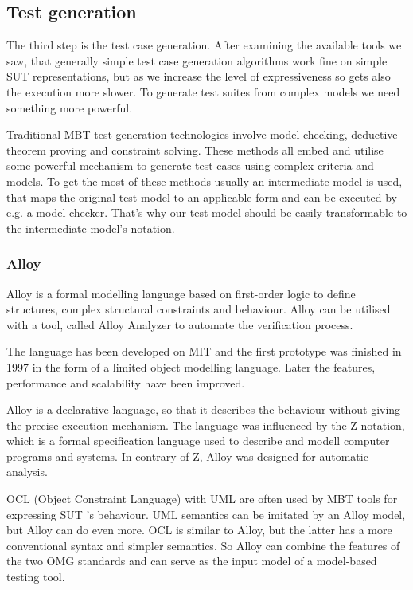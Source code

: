 
\subsection{Test generation}
\label{sub:designtestgeneration}

The third step is the test case generation. After examining the available tools we saw, that generally simple test case generation algorithms work fine on simple SUT representations, but as we increase the level of expressiveness so gets also the execution more slower. To generate test suites from complex models we need something more powerful.

Traditional MBT test generation technologies involve model checking, deductive theorem proving and constraint solving. These methods all embed and utilise some powerful mechanism to generate test cases using complex criteria and models. To get the most of these methods usually an intermediate model is used, that maps the original test model to an applicable form and can be executed by e.g. a model checker. That's why our test model should be easily transformable to the intermediate model's notation.

\subsubsection{Alloy}
\label{ssub:alloy}

Alloy \cite{alloy}\cite{alloyfirst}\cite{psm2alloy} is a formal modelling language based on first-order logic to define structures, complex structural constraints and behaviour. Alloy can be utilised with a tool, called Alloy Analyzer to automate the verification process.

The language has been developed on MIT and the first prototype was finished in 1997 in the form of a limited object modelling language. Later the features, performance and scalability have been improved.

Alloy is a declarative language, so that it describes the behaviour without giving the precise execution mechanism. The language was influenced by the Z notation, which is a formal specification language used to describe and modell computer programs and systems. In contrary of Z, Alloy was designed for automatic analysis.

OCL (Object Constraint Language) with UML are often used by MBT tools for expressing SUT 's behaviour. UML semantics can be imitated by an Alloy model, but Alloy can do even more. OCL is similar to Alloy, but the latter has a more conventional syntax and simpler semantics. So Alloy can combine the features of the two OMG standards and can serve as the input model of a model-based testing tool.

